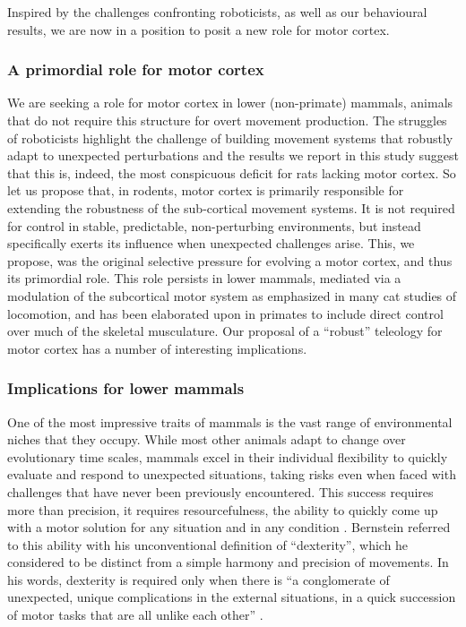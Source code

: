 Inspired by the challenges confronting roboticists, as well as our behavioural results, we are now in a position to posit a new role for motor cortex.

\subsubsection*{A primordial role for motor cortex}

We are seeking a role for motor cortex in lower (non-primate) mammals, animals that do not require this structure for overt movement production. The struggles of roboticists highlight the challenge of building movement systems that robustly adapt to unexpected perturbations and the results we report in this study suggest that this is, indeed, the most conspicuous deficit for rats lacking motor cortex. So let us propose that, in rodents, motor cortex is primarily responsible for extending the robustness of the sub-cortical movement systems. It is not required for control in stable, predictable, non-perturbing environments, but instead specifically exerts its influence when unexpected challenges arise. This, we propose, was the original selective pressure for evolving a motor cortex, and thus its primordial role. This role persists in lower mammals, mediated via a modulation of the subcortical motor system as emphasized in many cat studies of locomotion, and has been elaborated upon in primates to include direct control over much of the skeletal musculature. Our proposal of a ``robust'' teleology for motor cortex has a number of interesting implications.

\subsubsection*{Implications for lower mammals}

One of the most impressive traits of mammals is the vast range of environmental niches that they occupy. While most other animals adapt to change over evolutionary time scales, mammals excel in their individual flexibility to quickly evaluate and respond to unexpected situations, taking risks even when faced with challenges that have never been previously encountered. This success requires more than precision, it requires resourcefulness, the ability to quickly come up with a motor solution for any situation and in any condition \cite{Bernstein1996}. Bernstein referred to this ability with his unconventional definition of ``dexterity'', which he considered to be distinct from a simple harmony and precision of movements. In his words, dexterity is required only when there is \enquote{a conglomerate of unexpected, unique complications in the external situations, in a quick succession of motor tasks that are all unlike each other} \cite{Bernstein1996}.

